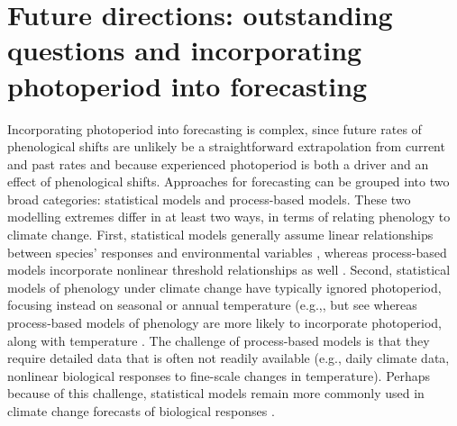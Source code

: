 \documentclass{article}
\begin{document}

\section*{Future directions: outstanding questions and incorporating photoperiod into forecasting}
\par  Incorporating photoperiod into forecasting is complex, since future rates of phenological shifts are unlikely be a straightforward extrapolation from current and past rates and because experienced photoperiod is both a driver and an effect of phenological shifts. Approaches for forecasting can be grouped into two broad categories: statistical models and process-based models. These two modelling extremes differ in at least two ways, in terms of relating phenology to climate change. First, statistical models generally assume linear relationships between species' responses and environmental variables \citep[e.g., ][]{flynn2018,van2007,ibanez2010}, whereas process-based models incorporate nonlinear threshold relationships as well \citep[e.g.][]{chuine2001,morin2009,xie1989}. Second, statistical models of phenology under climate change have typically ignored photoperiod, focusing instead on seasonal or annual temperature (e.g.,\citet{van2007,ibanez2010,diez2012}, but see \citet[][]{richardson2013}%
whereas process-based models of phenology are more likely to incorporate photoperiod, along with temperature \citep{duputie2015,morin2009,xie1989,zhao2013}. The challenge of process-based models is that they require detailed data that is often not readily available (e.g., daily climate data, nonlinear biological responses to fine-scale changes in temperature). Perhaps because of this challenge, statistical models remain more commonly used in climate change forecasts of biological responses \citep[e.g.,][]{Basler:2012, zhu2012,garcia2016,van2007,ibanez2010,diez2012}.
\end{document}
